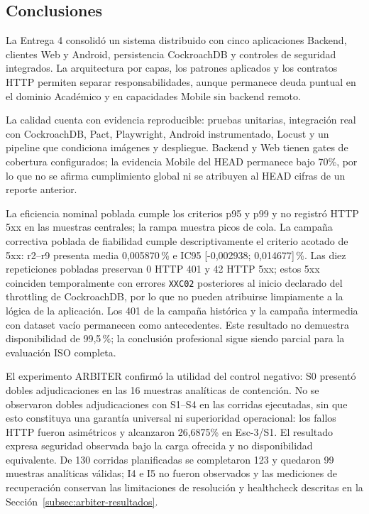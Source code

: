 \subsection{Conclusiones}
\label{subsec:conclusiones-e4}

La Entrega 4 consolidó un sistema distribuido con cinco aplicaciones Backend,
clientes Web y Android, persistencia CockroachDB y controles de seguridad
integrados. La arquitectura por capas, los patrones aplicados y los contratos
HTTP permiten separar responsabilidades, aunque permanece deuda puntual en el
dominio Académico y en capacidades Mobile sin backend remoto.

La calidad cuenta con evidencia reproducible: pruebas unitarias, integración
real con CockroachDB, Pact, Playwright, Android instrumentado, Locust y un
pipeline que condiciona imágenes y despliegue. Backend y Web tienen gates de
cobertura configurados; la evidencia Mobile del HEAD permanece bajo 70\%, por
lo que no se afirma cumplimiento global ni se atribuyen al HEAD cifras de un
reporte anterior.

La eficiencia nominal poblada cumple los criterios p95 y p99 y no registró HTTP 5xx en
las muestras centrales; la rampa muestra picos de cola. La campaña correctiva
poblada de fiabilidad cumple descriptivamente el criterio acotado de 5xx:
r2--r9 presenta media 0,005870\,\% e IC95 [-0,002938; 0,014677]\,\%. Las diez
repeticiones pobladas preservan 0 HTTP 401 y 42 HTTP 5xx; estos 5xx coinciden
temporalmente con errores \texttt{XXC02} posteriores al inicio declarado del
throttling de CockroachDB, por lo que no pueden atribuirse limpiamente a la
lógica de la aplicación. Los 401 de la campaña histórica y la campaña
intermedia con dataset vacío permanecen como antecedentes. Este resultado no
demuestra disponibilidad de 99,5\,\%; la conclusión profesional sigue siendo
parcial para la evaluación ISO completa.

El experimento ARBITER confirmó la utilidad del control negativo: S0 presentó
dobles adjudicaciones en las 16 muestras analíticas de contención. No se
observaron dobles adjudicaciones con S1--S4 en las corridas ejecutadas, sin que
esto constituya una garantía universal ni superioridad operacional: los fallos
HTTP fueron asimétricos y alcanzaron 26,6875\% en Esc-3/S1. El resultado expresa
seguridad observada bajo la carga ofrecida y no disponibilidad equivalente. De
130 corridas planificadas se
completaron 123 y quedaron 99 muestras analíticas válidas; I4 e I5 no fueron
observados y las mediciones de recuperación conservan las limitaciones de
resolución y healthcheck descritas en la Sección~\ref{subsec:arbiter-resultados}.

